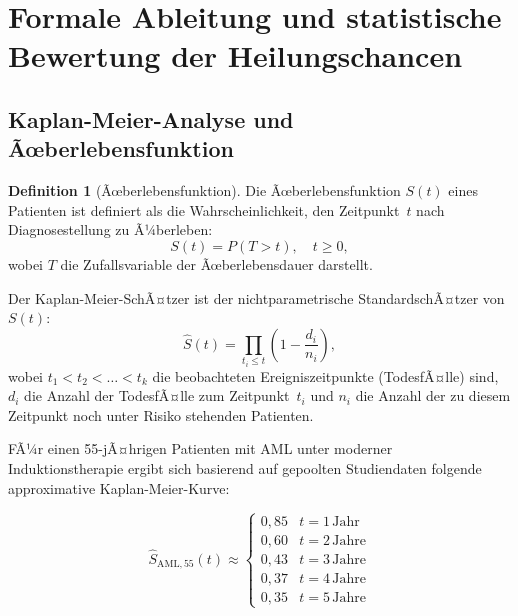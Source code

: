 ﻿\documentclass[12pt,a4paper]{article}
\theoremstyle{definition}
\newtheorem{definition}[theorem]{Definition}
\begin{document}
\section{Formale Ableitung und statistische Bewertung der Heilungschancen}
\label{sec:formal}

\subsection{Kaplan-Meier-Analyse und Ãœberlebensfunktion}

\begin{definition}[Ãœberlebensfunktion]
  Die Ãœberlebensfunktion $S(t)$ eines Patienten ist definiert als die
  Wahrscheinlichkeit, den Zeitpunkt~$t$ nach Diagnosestellung zu Ã¼berleben:
  \begin{equation}
    S(t) = P(T > t), \quad t \geq 0,
    \label{eq:survival_function}
  \end{equation}
  wobei $T$ die Zufallsvariable der Ãœberlebensdauer darstellt.
\end{definition}

Der Kaplan-Meier-SchÃ¤tzer \cite{kaplan1958} ist der nichtparametrische
StandardschÃ¤tzer von $S(t)$:
\begin{equation}
  \hat{S}(t) = \prod_{t_i \leq t} \left(1 - \frac{d_i}{n_i}\right),
  \label{eq:km}
\end{equation}
wobei $t_1 < t_2 < \ldots < t_k$ die beobachteten Ereigniszeitpunkte (TodesfÃ¤lle)
sind, $d_i$ die Anzahl der TodesfÃ¤lle zum Zeitpunkt~$t_i$ und $n_i$ die Anzahl der
zu diesem Zeitpunkt noch unter Risiko stehenden Patienten.

FÃ¼r einen 55-jÃ¤hrigen Patienten mit AML unter moderner Induktionstherapie ergibt
sich basierend auf gepoolten Studiendaten \cite{dohner2017,burnett2007} folgende
approximative Kaplan-Meier-Kurve:

\begin{equation}
  \hat{S}_{\mathrm{AML},55}(t) \approx
  \begin{cases}
    0{,}85 & t = 1\,\text{Jahr} \\
    0{,}60 & t = 2\,\text{Jahre} \\
    0{,}43 & t = 3\,\text{Jahre} \\
    0{,}37 & t = 4\,\text{Jahre} \\
    0{,}35 & t = 5\,\text{Jahre}
  \end{cases}
  \label{eq:km_aml}
\end{equation}
\end{document}
